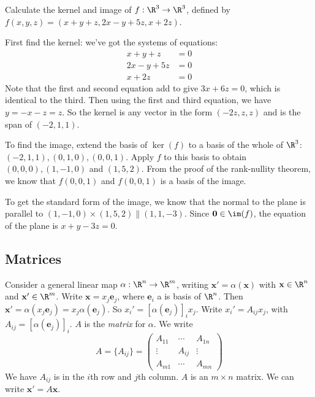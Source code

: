 \documentclass[a4paper]{article}
\begin{document}
\begin{eg}
  Calculate the kernel and image of $f:\R^3\to \R^3$, defined by $f(x, y, z) = (x + y + z, 2x - y+ 5z, x + 2z)$.

  First find the kernel: we've got the systems of equations:
  \begin{align*}
    x + y + z &= 0\\
    2x - y + 5z &= 0\\
    x + 2z  &= 0
  \end{align*}
  Note that the first and second equation add to give $3x + 6z = 0$, which is identical to the third. Then using the first and third equation, we have $y = -x - z = z$. So the kernel is any vector in the form $(-2z, z, z)$ and is the span of $(-2, 1, 1)$.

  To find the image, extend the basis of $\ker(f)$ to a basis of the whole of $\R^3$: $(-2, 1, 1), (0, 1, 0), (0, 0, 1)$. Apply $f$ to this basis to obtain $(0, 0, 0), (1, -1, 0)$ and $(1, 5, 2)$. From the proof of the rank-nullity theorem, we know that $f(0, 0, 1)$ and $f(0, 0, 1)$ is a basis of the image.

  To get the standard form of the image, we know that the normal to the plane is parallel to $(1, -1, 0)\times (1, 5, 2) \parallel (1, 1, -3)$. Since $\mathbf{0}\in \im (f)$, the equation of the plane is $x + y - 3z = 0$.
\end{eg}

\subsection{Matrices}
\begin{defi}[Matrix]
  Consider a general linear map $\alpha: \R^n\to \R^m$, writing $\mathbf{x}' = \alpha(\mathbf{x})$ with $\mathbf{x}\in \R^n$ and $\mathbf{x}'\in \R^m$. Write $\mathbf{x} = x_j\mathbf{e}_j$, where $\mathbf{e}_i$ a is basis of $\R^n$. Then $\mathbf{x}' = \alpha (x_j\mathbf{e}_j) = x_j\alpha(\mathbf{e}_j)$. So $x_i' = [\alpha(\mathbf{e}_j)]_ix_j$. Write $x_i' = A_{ij}x_j$, with $A_{ij} = [\alpha(\mathbf{e}_j)]_i$. $A$ is the \emph{matrix} for $\alpha$. We write
  \[
    A = \{A_{ij}\} =
    \begin{pmatrix}
      A_{11} & \cdots & A_{1n}\\
      \vdots & A_{ij} & \vdots\\
      A_{m1} & \cdots & A_{mn}
    \end{pmatrix}
  \]
  We have $A_{ij}$ is in the $i$th row and $j$th column. $A$ is an $m\times n$ matrix. We can write $\mathbf{x'} = A\mathbf{x}$.
\end{defi}
\end{document}
